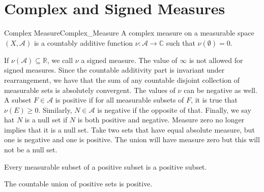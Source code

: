\documentclass[crop=false,class=article]{standalone}                           %
\begin{document}
    \section{Complex and Signed Measures}
        \begin{fdefinition}{Complex Measure}{Complex_Measure}
            A complex measure on a measurable space $(X,\mathcal{A})$ is a
            countably additive function $\nu:\mathcal{A}\rightarrow\mathbb{C}$
            such that $\nu(\emptyset)=0$.
        \end{fdefinition}
        If $\nu(\mathcal{A})\subseteq\mathbb{R}$, we call $\nu$ a signed
        measure. The value of $\infty$ is not allowed for signed measures. Since
        the countable additivity part is invariant under rearrangement, we have
        that the sum of any countable disjoint collection of measurable sets is
        absolutely convergent. The values of $\nu$ can be negative as well.
        A subset $F\in\mathcal{A}$ is positive if for all measurable subsets
        of $F$, it is true that $\nu(E)\geq{0}$. Similarly, $N\in\mathcal{A}$
        is negative if the opposite of that. Finally, we say hat $N$ is a null
        set if $N$ is both positive and negative. Measure zero no longer implies
        that it is a null set. Take two sets that have equal absolute measure,
        but one is negative and one is positive. The union will have measure
        zero but this will not be a null set.
        \begin{theorem}
            Every measurable subset of a positive subset is a positive subset.
        \end{theorem}
        \begin{theorem}
            The countable union of positive sets is positive.
        \end{theorem}
\end{document}
